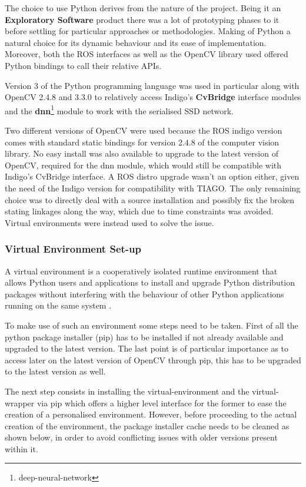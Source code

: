 The choice to use Python derives from the nature of the project. Being it an \textbf{Exploratory Software} product there was a lot of prototyping phases to it before settling for particular approaches or methodologies. Making of Python a natural choice for its dynamic behaviour and its ease of implementation. Moreover, both the ROS interfaces as well as the OpenCV library used offered Python bindings to call their relative APIs.

Version 3 of the Python programming language was used in particular along with OpenCV 2.4.8 and 3.3.0 to relatively access Indigo's \textbf{CvBridge} interface modules and the \textbf{dnn}\footnote{deep-neural-network} module to work with the serialised SSD network.

Two different versions of OpenCV were used because the ROS indigo version comes with standard static bindings for version 2.4.8 of the computer vision library. No easy install was also available to upgrade to the latest version of OpenCV, required for the dnn module, which would still be compatible with Indigo's CvBridge interface. A ROS distro upgrade wasn't an option either, given the need of the Indigo version for compatibility with TIAGO. The only remaining choice was to directly deal with a source installation and possibly fix the broken stating linkages along the way, which due to time constraints was avoided. Virtual environments were instead used to solve the issue.

\subsubsection{Virtual Environment Set-up}

A virtual environment is a cooperatively isolated runtime environment that allows Python users and applications to install and upgrade Python distribution packages without interfering with the behaviour of other Python applications running on the same system \cite{website:virtualEnv}.

To make use of such an environment some steps need to be taken. First of all the python package installer (pip) has to be installed if not already available and upgraded to the latest version. The last point is of particular importance as to access later on the latest version of OpenCV through pip, this has to be upgraded to the latest version as well.

The next step consists in installing the virtual-environment and the virtual-wrapper via pip which offers a higher level interface for the former to ease the creation of a personalised environment. However, before proceeding to the actual creation of the environment, the package installer cache needs to be cleaned as shown below, in order to avoid conflicting issues with older versions present within it.

